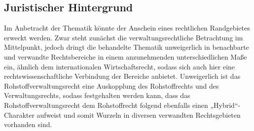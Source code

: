 \documentclass[12pt,a4paper,oneside]{book} %
\begin{document}
	\subsection{Juristischer Hintergrund}
	Im Anbetracht der Thematik könnte der Anschein eines rechtlichen Randgebietes erweckt werden. Zwar steht zunächst die verwaltungsrechtliche Betrachtung im Mittelpunkt, jedoch dringt die behandelte Thematik unweigerlich in benachbarte und verwandte Rechtsbereiche in einem anzunehmenden unterschiedlichen Maße ein, ähnlich dem internationalen Wirtschaftsrecht, sodass sich auch hier eine rechtswissenschaftliche Verbindung der Bereiche anbietet. \autocite[1, 2]{herdegen_internationales_2020} Unweigerlich ist das Rohstoffverwaltungsrecht eine Auskopplung des Rohstoffrechts und des Verwaltungsrechts, sodass festgehalten werden kann, dass das Rohstoffverwaltungsrecht dem Rohstoffrecht folgend ebenfalls einen „Hybrid“-Charakter aufweist und somit Wurzeln in diversen verwandten Rechtsgebieten vorhanden sind. \autocite[358]{terhechte_konsolidierung_2015}
	
\end{document}
